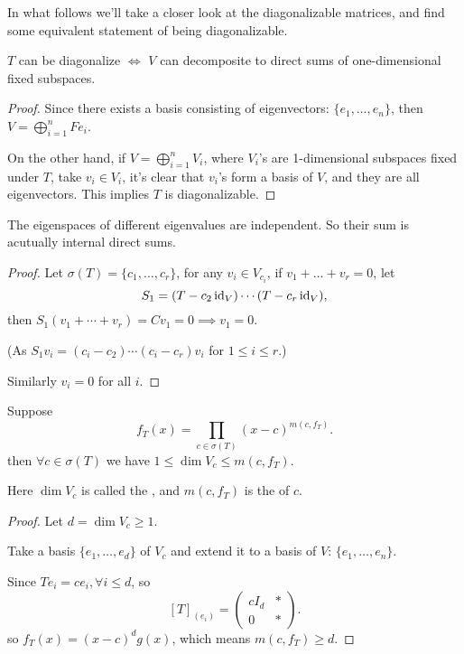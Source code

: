 In what follows we'll take a closer look at the diagonalizable matrices,
and find some equivalent statement of being diagonalizable.

\begin{proposition}
	$T$ can be diagonalize  $\iff$ $V$ can decomposite to direct sums of
	one-dimensional fixed subspaces.
\end{proposition}
\begin{proof}[Proof]
    Since there exists a basis consisting of eigenvectors:
	$\{e_1,\dots,e_n\}$, then $V = \bigoplus_{i=1}^n Fe_i$.

	On the other hand, if $V = \bigoplus_{i=1}^n V_i$,
	where $V_i$'s are 1-dimensional subspaces fixed under  $T$,
	take $v_i\in V_i$, it's clear that $v_i$'s form a basis of  $V$,
	and they are all eigenvectors.
	This implies  $T$ is diagonalizable.
\end{proof}

\begin{proposition}
	The eigenspaces of different eigenvalues are independent.
	So their sum is acutually internal direct sums.
\end{proposition}
\begin{proof}[Proof]
    Let $\sigma(T)=\{c_1,\dots,c_r\}$, for any $v_i\in V_{c_i}$,
	if $v_1+\dots+v_r = 0$,
	let
	\[
	S_1 = (T-c_2\operatorname{id}_V)\cdots (T-c_r\operatorname{id}_V),
	\]
	then $S_1(v_1+\cdots+v_r) = Cv_1 = 0\implies v_1=0$.

	(As $S_1v_i = (c_i-c_2)\cdots (c_i - c_r)v_i$ for  $1\le i\le r$.)

	Similarly $v_i=0$ for all  $i$.
\end{proof}

\begin{proposition}
	Suppose
	\[
		f_T(x)=\prod_{c\in\sigma(T)}(x-c)^{m(c,f_T)}.
	\]
	then $\forall c\in \sigma(T)$ we have  $1\le \dim V_c\le m(c,f_T)$.

	Here $\dim V_c$ is called the ,
	and $m(c,f_T)$ is the  of $c$.
\end{proposition}
\begin{proof}[Proof]
    Let $d=\dim V_c\ge 1$.

	Take a basis $\{e_1,\dots,e_d\}$ of  $V_c$ and extend it to a basis of $V$:
	 $\{e_1,\dots,e_n\}$.

	 Since $Te_i=ce_i, \forall i\le d$, so
	 \[
		 [T]_{(e_i)} = \begin{pmatrix}
			 cI_d &* \\ 0 &*
		 \end{pmatrix}.
	 \]
	 so $f_T(x)=(x-c)^dg(x)$, which means $m(c,f_T)\ge d$.
\end{proof}

